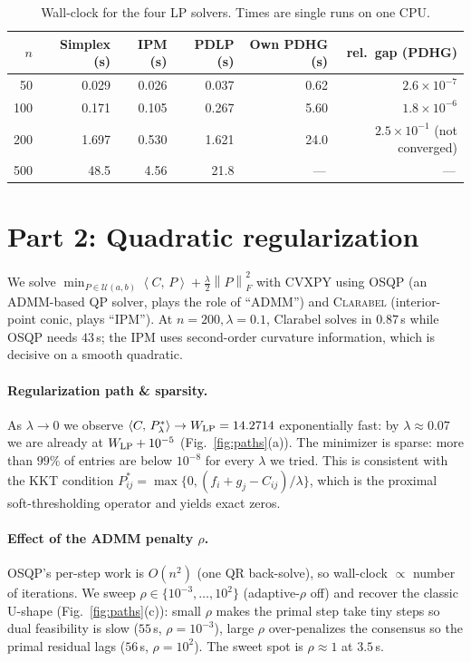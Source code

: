 \documentclass[11pt]{article}
\newcommand{\inner}[2]{\left\langle #1,\,#2 \right\rangle}
\newcommand{\norm}[1]{\left\lVert #1 \right\rVert}
\newcommand{\Pol}{\mathcal{U}(a,b)}
\begin{document}
\begin{table}[H]
\centering\small
\begin{tabular}{r r r r r r}
\toprule
$n$ & Simplex (s) & IPM (s) & PDLP (s) & Own PDHG (s) & rel.\ gap (PDHG)\\
\midrule
 50 & 0.029 & 0.026 & 0.037 & 0.62 & $2.6\times 10^{-7}$\\
100 & 0.171 & 0.105 & 0.267 & 5.60 & $1.8\times 10^{-6}$\\
200 & 1.697 & 0.530 & 1.621 & 24.0 & $2.5\times 10^{-1}$ (not converged)\\
500 & 48.5  & 4.56  & 21.8  & \,---\, & \,---\, \\
\bottomrule
\end{tabular}
\caption{Wall-clock for the four LP solvers. Times are single runs on one CPU.}
\label{tab:part1}
\end{table}

\section{Part 2: Quadratic regularization}
We solve $\min_{P\in\Pol}\inner{C}{P} + \tfrac{\lambda}{2}\norm{P}_F^2$
with CVXPY using \textsc{OSQP} (an ADMM-based QP solver, plays the role of
``ADMM'') and \textsc{Clarabel} (interior-point conic, plays ``IPM''). At
$n{=}200,\lambda{=}0.1$, Clarabel solves in $0.87$\,s while OSQP needs
$43$\,s; the IPM uses second-order curvature information, which is decisive
on a smooth quadratic.

\paragraph{Regularization path \& sparsity.} As $\lambda\to 0$ we observe
$\inner{C}{P_\lambda^*}\to W_{\rm LP}=14.2714$ exponentially fast: by
$\lambda{\approx}0.07$ we are already at $W_{\rm LP}+10^{-5}$
(Fig.~\ref{fig:paths}(a)). The minimizer is sparse: more than $99\%$ of entries
are below $10^{-8}$ for every $\lambda$ we tried. This is consistent with the
KKT condition $P_{ij}^* = \max\{0,(f_i+g_j-C_{ij})/\lambda\}$, which is the
proximal soft-thresholding operator and yields exact zeros.

\paragraph{Effect of the ADMM penalty $\rho$.} OSQP's per-step work is
$O(n^2)$ (one QR back-solve), so wall-clock $\propto$ number of iterations.
We sweep $\rho\in\{10^{-3},\dots,10^2\}$ (adaptive-$\rho$ off) and recover the
classic U-shape (Fig.~\ref{fig:paths}(c)): small $\rho$ makes the primal step
take tiny steps so dual feasibility is slow ($55$\,s, $\rho{=}10^{-3}$),
large $\rho$ over-penalizes the consensus so the primal residual lags
($56$\,s, $\rho{=}10^{2}$). The sweet spot is $\rho{\approx}1$ at $3.5$\,s.
\end{document}

